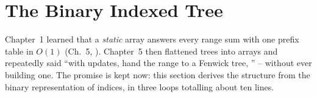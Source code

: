 \section{The Binary Indexed Tree}\label{sec:c14-core}

\begin{previouslybox}
Chapter~1 learned that a \emph{static} array answers every range sum with one
prefix table in \(O(1)\) (Ch.~5, ).  Chapter~5 then
flattened trees into arrays and repeatedly said ``with updates, hand the
range to a Fenwick tree, '' -- without ever building one.  The
promise is kept now: this section derives the structure from the binary
representation of indices, in three loops totalling about ten lines.
\end{previouslybox}

